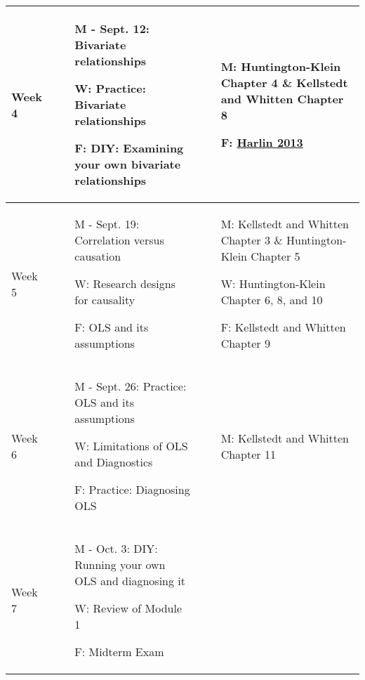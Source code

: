 \documentclass[11pt, a4paper]{article}
\begin{document}
\begin{longtable}[hbt!]{p{}p{}p{}}
        \hline
        Week 4 & \begin{itemize} \item[M - Sept. 12:] Bivariate relationships \item[W:] Practice: Bivariate relationships \item[F:] DIY: Examining your own bivariate relationships \end{itemize} & \begin{itemize} \item[M:] Huntington-Klein Chapter 4 \& Kellstedt and Whitten Chapter 8 \item[F:] \href{https://www.buzzfeednews.com/article/kjh2110/the-10-most-bizarre-correlations}{Harlin 2013} \end{itemize} \\
        \hline 
        Week 5 & \begin{itemize} \item[M - Sept. 19:] Correlation versus causation \item[W:] Research designs for causality \item[F:] OLS and its assumptions \end{itemize} & \begin{itemize} \item[M:] Kellstedt and Whitten Chapter 3 \& Huntington-Klein Chapter 5 \item[W:] Huntington-Klein Chapter 6, 8, and 10 \item[F:] Kellstedt and Whitten Chapter 9 \end{itemize} \\
        \hline 
        Week 6 & \begin{itemize} \item[M - Sept. 26:] Practice: OLS and its assumptions \item[W:] Limitations of OLS and Diagnostics \item[F:] Practice: Diagnosing OLS \end{itemize} & \begin{itemize} \item[M:] Kellstedt and Whitten Chapter 11 \end{itemize} \\
        \hline 
        Week 7 & \begin{itemize} \item[M - Oct. 3:] DIY: Running your own OLS and diagnosing it \item[W:] Review of Module 1 \item[F:] Midterm Exam \end{itemize} & \\

\end{longtable}
\end{document}
